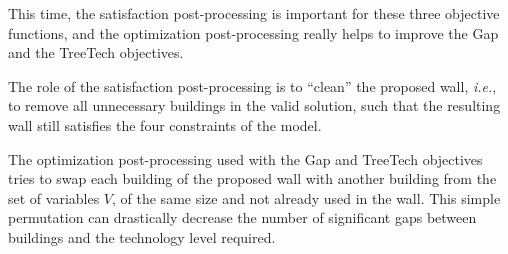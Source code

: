 \documentclass[journal]{IEEEtran}
\newcommand{\ie}{\textit{i.e.}}
\begin{document}
This  time, the  satisfaction post-processing  is important  for these
three objective functions, and the optimization post-processing really
helps to improve the Gap and the TreeTech objectives.

The  role of  the  satisfaction post-processing  is  to ``clean''  the
proposed wall, \ie,  to remove all unnecessary buildings  in the valid
solution,  such  that the  resulting  wall  still satisfies  the  four
constraints of the model.

The  optimization  post-processing  used  with the  Gap  and  TreeTech
objectives  tries to  swap each  building  of the  proposed wall  with
another building from  the set of variables $V$, of  the same size and
not already used in the  wall. This simple permutation can drastically
decrease  the number  of significant  gaps between  buildings and  the
technology level required.
\end{document}
